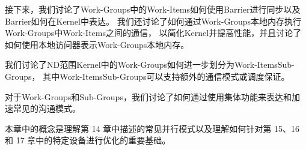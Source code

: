 接下来，我们讨论了Work-Groups中的Work-Items如何使用Barrier进行同步以及Barrier如何在Kernel中表达。 
我们还讨论了如何通过Work-Groups本地内存执行Work-Groups中Work-Items之间的通信，
以简化Kernel并提高性能，并且讨论了如何使用本地访问器表示Work-Groups本地内存。

我们讨论了ND范围Kernel中的Work-Groups如何进一步划分为Work-ItemsSub-Groups，
其中Work-ItemsSub-Groups可以支持额外的通信模式或调度保证。

对于Work-Groups和Sub-Groups，我们讨论了如何通过使用集体功能来表达和加速常见的沟通模式。

本章中的概念是理解第 14 章中描述的常见并行模式以及理解如何针对第 15、16 和 17 章中的特定设备进行优化的重要基础。